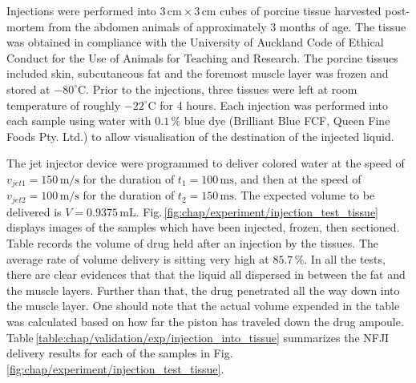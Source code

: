         
            Injections were performed into $3\,\mathrm{cm} \times 3\,\mathrm{cm}$ cubes of porcine tissue harvested post-mortem from the abdomen animals of approximately 3 months of age. The tissue was obtained in compliance with the University of Auckland Code of Ethical Conduct for the Use of Animals for Teaching and Research. The porcine tissues included skin, subcutaneous fat and the foremost muscle layer was frozen and stored at $-80^{\circ}\mathrm{C}$. Prior to the injections, three tissues were left at room temperature of roughly $-22^{\circ}\mathrm{C}$ for 4 hours. Each injection was performed into each sample using water with $0.1\,\%$ blue dye (Brilliant Blue FCF, Queen Fine Foods Pty. Ltd.) to allow visualisation of the destination of the injected liquid.
            
            
            The jet injector device were programmed to deliver colored water at the speed of $v_{jet1}=150\,\mathrm{m/s}$ for the duration of $t_1=100\,\mathrm{ms}$, and then at the speed of $v_{jet2}=100\,\mathrm{m/s}$ for the duration of $t_2=150\,\mathrm{ms}$. The expected volume to be delivered is $V=0.9375\,\mathrm{mL}$. Fig.\,\ref{fig:chap/experiment/injection_test_tissue} displays images of the samples which have been injected, frozen, then sectioned. Table records the volume of drug held after an injection by the tissues. The average rate of volume delivery is sitting very high at $85.7\,\%$. In all the tests, there are clear evidences that that the liquid all dispersed in between the fat and the muscle layers. Further than that, the drug penetrated all the way down into the muscle layer. One should note that the actual volume expended in the table was calculated based on how far the piston has traveled down the drug ampoule. Table\,\ref{table:chap/validation/exp/injection_into_tissue} summarizes the \acs{NFJI} delivery results for each of the samples in Fig.\,\ref{fig:chap/experiment/injection_test_tissue}.
            
